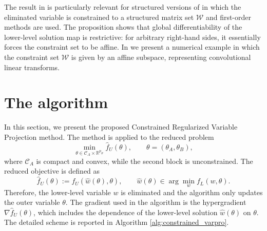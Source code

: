 \documentclass{article}
\begin{document}
The result in  is particularly
relevant for structured versions of  in
which the eliminated variable is constrained to a structured matrix set
$\mathscr W$ and first-order methods are used. The proposition shows that global differentiability of the lower-level solution map is restrictive: for arbitrary right-hand sides, it essentially forces the constraint set to be affine.
In  we present a numerical example in which the constraint set $\mathscr W$ is given by an affine subspace, representing convolutional linear transforms.








































\section{The algorithm}

In this section, we present the proposed Constrained Regularized Variable Projection method. The method
is applied to the reduced problem
\begin{equation}\label{probFW}
    \min_{\theta\in \mathcal  C_A\times \mathbb{R}^{p_B}} \widehat f_U(\theta),
    \qquad
    \theta=(\theta_A,\theta_B),
\end{equation}
where \(\mathcal C_A\) is compact and convex, while the second block is unconstrained. The reduced
objective is defined as
\[
    \widehat f_U(\theta)
    :=
    f_U(\widehat w(\theta),\theta),
    \qquad
    \widehat w(\theta)\in \arg\min_w f_L(w,\theta).
\]
Therefore, the lower-level variable \(w\) is eliminated and the algorithm only updates the
outer variable \(\theta\). The gradient used in the algorithm is the hypergradient
\(\nabla \widehat f_U(\theta)\), which includes the dependence of the lower-level solution
\(\widehat w(\theta)\) on \(\theta\). The detailed scheme is reported in Algorithm \ref{alg:constrained_varpro}.
\end{document}
